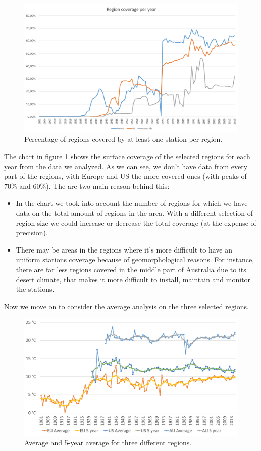 \documentclass{vldb}
\begin{document}
\begin{figure}[tbh]
\includegraphics[width=1\linewidth]{stationsRegion}
\caption{Percentage of regions covered by at least one station per region.}
\label{fig:stationsRegion}
\end{figure}

The chart in figure \ref{fig:stationsRegion} shows the surface coverage of the selected regions for each year from the data we analyzed. As we can see, we don't have data from every part of the regions, with Europe and US the more covered ones (with peaks of 70\% and 60\%). The are two main reason behind this:
\begin{itemize}
    \item In the chart we took into account the number of regions for which we have data on the total amount of regions in the area. With a different selection of region size we could increase or decrease the total coverage (at the expense of precision).
    \item There may be areas in the regions where it's more difficult to have an uniform stations coverage because of geomorphological reasons. For instance, there are far less regions covered in the middle part of Australia due to its desert climate, that makes it more difficult to install, maintain and monitor the stations.
\end{itemize}

Now we move on to consider the average analysis on the three selected regions. 

\begin{figure}[tbh]
\includegraphics[width=1\linewidth]{averageRegions}
\caption{Average and 5-year average for three different regions.}
\label{fig:averageRegions}
\end{figure}
\end{document}
